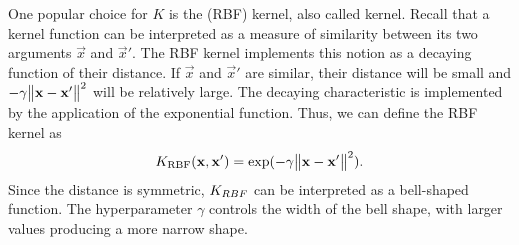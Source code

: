 \documentclass[
	fontsize=10pt, %
	twoside=false, %
	secnumdepth=1, %
  toc=indentunnumbered %
]{kaobook}
\begin{document}
One popular choice for $K$ is the  (RBF) kernel,
also called  kernel. Recall that a kernel function can be
interpreted as a measure of similarity between its two arguments $\vec x$ and
$\vec x'$. The RBF kernel implements this notion as a decaying function of their
distance. If $\vec x$ and $\vec x'$ are similar, their distance will be small and $-
\gamma \norm{\mathbf{x} - \mathbf{x}'}^2$ will be relatively large. The decaying
characteristic is implemented by the application of the exponential function.
Thus, we can define the RBF kernel as
\begin{align}
  K_{\text{RBF}} (\mathbf{x}, \mathbf{x}') = \exp( -\gamma \norm{\mathbf{x} - \mathbf{x}'}^2 ).
  \label{eq:rbf-kernel}
\end{align}
Since the distance is symmetric, $K_{RBF}$ can be interpreted as a bell-shaped
function.
The hyperparameter $\gamma$ controls the width of the bell shape, with
larger values producing a more narrow shape. 







\end{document}
